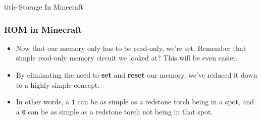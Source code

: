 \documentclass{beamer}
\begin{document}
             \begin{frame}
                \vfill
                \centering
                \begin{beamercolorbox}[sep=8pt,center,shadow=true,rounded=true]{title}
                    Storage In Minecraft\par%
                \end{beamercolorbox}
                \vfill
             \end{frame}
             
             \begin{frame}
             	\frametitle{ROM in Minecraft}
             	\begin{itemize}
             		\item Now that our memory only has to be read-only, we're set. Remember that simple read-only memory circuit we looked at? This will be even easier.
             		\item By eliminating the need to \textbf{set} and \textbf{reset} our memory, we've reduced it down to a highly simple concept.
             		\item In other words, a \texttt{1} can be as simple as a redstone torch being in a spot, and a \texttt{0} can be as simple as a redstone torch not being in that spot.
             		
             	\end{itemize}
             	
             	{
             	\centering
             	


\begin{tikzpicture}[x=0.75pt,y=0.75pt,yscale=-1,xscale=1]


\end{tikzpicture}}
\end{frame}
\end{document}
